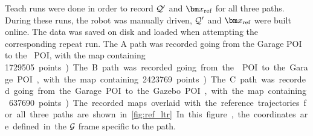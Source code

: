 
Teach runs were done in order to record $\mathcal{Q}'$ and $\reftraj$ for all three paths.
During these runs, the robot was manually driven, $\mathcal{Q}'$ and $\reftraj$ were built online. 
The data was saved on disk and loaded when attempting the corresponding repeat run.
The A path was recorded going from the Garage \ac{POI} to the \laverdiere~\ac{POI}, with the map containing \SI{1729505} points). %
The B path was recorded going from the \laverdiere~\ac{POI} to the Garage \ac{POI}, with the map containing \SI{2423769} points). %
The C path was recorded going from the Garage \ac{POI} to the Gazebo \ac{POI}, with the map containing \SI{637690} points). %
The recorded maps overlaid with the reference trajectories for all three paths are shown in~\autoref{fig:ref_ltr}.
In this figure, the coordinates are defined in the $\mathcal{G}$ frame specific to the path. 


